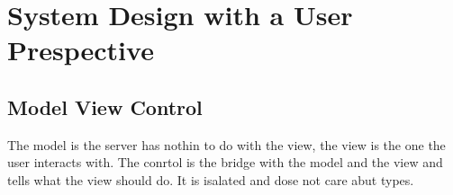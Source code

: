 \chapter{System Design with a User Prespective}

\newpage


\section{Model View Control}
The model is the server has nothin to do with the view, the view is the one the user
interacts with. The conrtol is the bridge with the model and the view and tells what the view should do. It is isalated and dose not care abut types.
